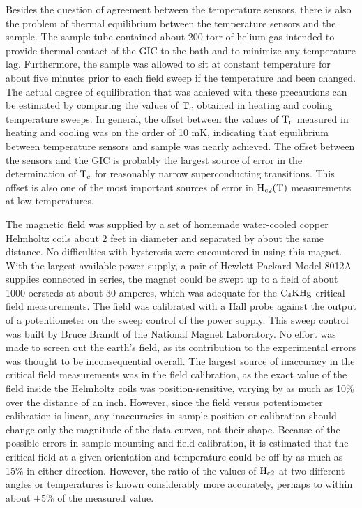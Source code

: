 	Besides the question of agreement between the  temperature sensors,
there is also the problem  of thermal equilibrium  between  the temperature
sensors and the sample.  The sample tube contained about 200 torr of helium
gas  intended to provide  thermal contact of  the GIC  to the  bath  and to
minimize any temperature lag.   Furthermore, the sample  was allowed to sit
at constant temperature for about five minutes prior to each field sweep if
the temperature had been changed.   The actual degree of equilibration that
was  achieved with  these  precautions can  be estimated  by comparing  the
values of $\rm T_c$ obtained in heating and cooling temperature sweeps.  In
general, the offset between the values of $\rm T_c$ measured in heating and
cooling  was on the  order  of  10 mK,  indicating that equilibrium between
temperature sensors and sample was nearly achieved.  The offset between the
sensors   and the  GIC is probably   the  largest  source of  error in  the
determination   of  $\rm   T_c  $  for reasonably  narrow   superconducting
transitions.  This offset is also   one of the most   important sources  of
error in $\rm H_{c2}(T)$ measurements at low temperatures.

	The magnetic field was supplied  by a  set of homemade water-cooled
copper Helmholtz coils about 2 feet in diameter and separated by  about the
same distance.  No  difficulties with hysteresis were  encountered in using
this magnet.  With the largest  available  power supply, a  pair of Hewlett
Packard Model 8012A supplies connected in series, the magnet could be swept
up to a field of about 1000 oersteds at about  30  amperes, which was adequate
for  the   $\rm  C_4KHg$  critical  field   measurements.   The field was
calibrated with a Hall  probe against the output of  a potentiometer on the
sweep control of the power supply.  This  sweep control was  built by Bruce
Brandt of the National Magnet Laboratory.  No effort was made to screen out
the  earth's field,  as its contribution to   the  experimental  errors was
thought to be inconsequential overall.  The largest source of inaccuracy in
the critical field measurements was in the  field calibration, as the exact
value of  the  field  inside  the  Helmholtz  coils was position-sensitive,
varying by  as much as  10\% over the distance of  an inch.  However, since
the field versus potentiometer  calibration is linear,  any inaccuracies in
sample position or calibration should change only the magnitude of the data
curves, not their shape.  Because of the possible errors in sample mounting
and field calibration, it is estimated  that the critical  field at a given
orientation and  temperature  could  be  off by as  much  as 15\%   in either
direction.  However,  the  ratio of the  values  of $\rm   H_{c2}$  at  two
different  angles or temperatures  is   known considerably more accurately,
perhaps to within about $\pm 5$\% of the measured value.

